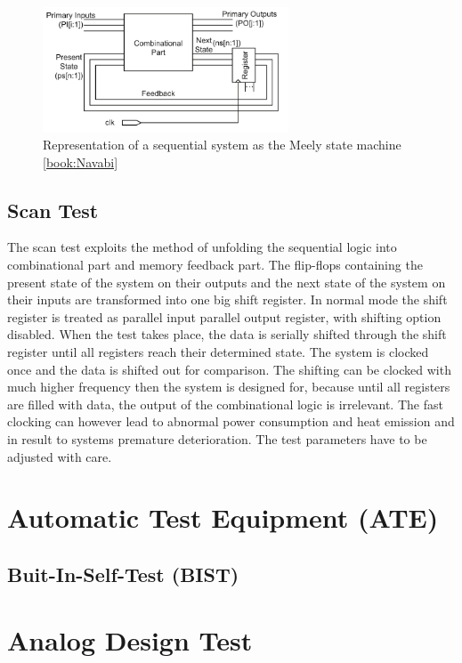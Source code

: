 \begin{figure}[H]
\centering
\includegraphics[width=0.65\textwidth]{figures/Meely.PNG}
\caption{Representation of a sequential system as the Meely state machine \ref{book:Navabi}}
\label{fig:Meely}
\end{figure}

\subsection{Scan Test}
The scan test exploits the method of unfolding the sequential logic into combinational part and memory feedback part. The flip-flops containing the present state of the system on their outputs and the next state of the system on their inputs are transformed into one big shift register. In normal mode the shift register is treated as parallel input parallel output register, with shifting option disabled. When the test takes place, the data is serially shifted through the shift register until all registers reach their determined state. The system is clocked once and the data is shifted out for comparison. The shifting can be clocked with much higher frequency then the system is designed for, because until all registers are filled with data, the output of the combinational logic is irrelevant. The fast clocking can however lead to abnormal power consumption and heat emission and in result to systems premature deterioration. The test parameters have to be adjusted with care.

\section{Automatic Test Equipment (ATE)}

\subsection{Buit-In-Self-Test (BIST)}
\section{Analog Design Test}




